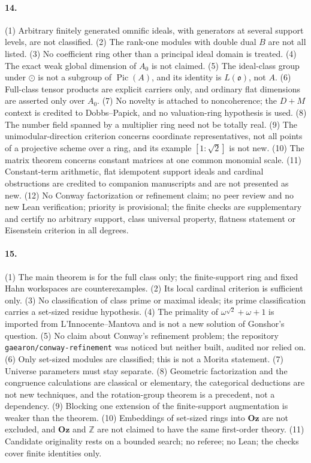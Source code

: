 \documentclass[11pt,letterpaper]{article}
\numberwithin{equation}{section}
\theoremstyle{definition}
\theoremstyle{remark}
\theoremstyle{plain}
\newcommand{\Oz}{\mathbf{Oz}}
\newcommand{\Z}{\mathbb Z}
\begin{document}
\paragraph{14.} (1) Arbitrary finitely generated omnific ideals, with generators at several support levels, are not
classified. (2) The rank-one modules with double dual $B$ are not all listed. (3) No coefficient ring other than a
principal ideal domain is treated. (4) The exact weak global dimension of $A_0$ is not claimed. (5) The ideal-class group
under $\odot$ is not a subgroup of $\operatorname{Pic}(A)$, and its identity is $L(\mathfrak o)$, not $A$. (6) Full-class
tensor products are explicit carriers only, and ordinary flat dimensions are asserted only over $A_0$. (7) No novelty is
attached to noncoherence; the $D+M$ context is credited to Dobbs--Papick, and no valuation-ring hypothesis is used.
(8) The number field spanned by a multiplier ring need not be totally real. (9) The unimodular-direction criterion
concerns coordinate representatives, not all points of a projective scheme over a ring, and its example $[1:\sqrt2]$ is
not new. (10) The matrix theorem concerns constant matrices at one common monomial scale. (11) Constant-term arithmetic,
flat idempotent support ideals and cardinal obstructions are credited to companion manuscripts and are not presented as
new. (12) No Conway factorization or refinement claim; no peer review and no new Lean verification; priority is
provisional; the finite checks are supplementary and certify no arbitrary support, class universal property, flatness
statement or Eisenstein criterion in all degrees.

\paragraph{15.} (1) The main theorem is for the full class only; the finite-support ring and fixed Hahn workspaces are
counterexamples. (2) Its local cardinal criterion is sufficient only. (3) No classification of class prime or maximal
ideals; its prime classification carries a set-sized residue hypothesis. (4) The primality of $\omega^{\sqrt2}+\omega+1$ is
imported from L'Innocente--Mantova and is not a new solution of Gonshor's question. (5) No claim about Conway's refinement
problem; the repository \texttt{gaearon/conway-refinement} was noticed but neither built, audited nor relied on. (6) Only
set-sized modules are classified; this is not a Morita statement. (7) Universe parameters must stay separate.
(8) Geometric factorization and the congruence calculations are classical or elementary, the categorical deductions are
not new techniques, and the rotation-group theorem is a precedent, not a dependency. (9) Blocking one extension of the
finite-support augmentation is weaker than the theorem. (10) Embeddings of set-sized rings into $\Oz$ are not excluded,
and $\Oz$ and $\Z$ are not claimed to have the same first-order theory. (11) Candidate originality rests on a bounded
search; no referee; no Lean; the checks cover finite identities only.
\end{document}
